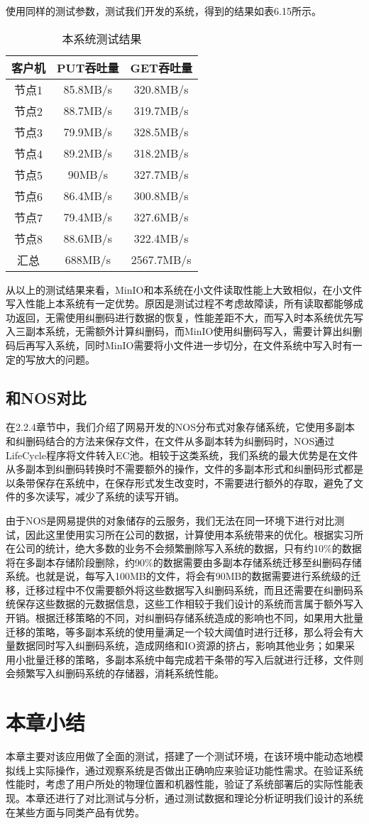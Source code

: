 使用同样的测试参数，测试我们开发的系统，得到的结果如表6.15所示。

\begin{table}[h]
    \centering
    \caption{本系统测试结果}
    \begin{tabular}{ccc}
      \toprule
      客户机   & PUT吞吐量  & GET吞吐量 \\
      \midrule
      节点1  & 85.8MB/s  & 320.8MB/s \\
      节点2  & 88.7MB/s  & 319.7MB/s \\
      节点3  & 79.9MB/s  & 328.5MB/s \\
      节点4  & 89.2MB/s  & 318.2MB/s \\
      节点5  & 90MB/s    & 327.7MB/s \\
      节点6  & 86.4MB/s  & 300.8MB/s \\
      节点7  & 79.4MB/s  & 327.6MB/s \\
      节点8  & 88.6MB/s  & 322.4MB/s \\
      汇总   & 688MB/s   & 2567.7MB/s \\
      \bottomrule
    \end{tabular}
\end{table}

从以上的测试结果来看，MinIO和本系统在小文件读取性能上大致相似，在小文件写入性能上本系统有一定优势。原因是测试过程不考虑故障读，所有读取都能够成功返回，无需使用纠删码进行数据的恢复，性能差距不大，而写入时本系统优先写入三副本系统，无需额外计算纠删码，而MinIO使用纠删码写入，需要计算出纠删码后再写入系统，同时MinIO需要将小文件进一步切分，在文件系统中写入时有一定的写放大的问题。

\subsection{和NOS对比}%
在2.2.4章节中，我们介绍了网易开发的NOS分布式对象存储系统，它使用多副本和纠删码结合的方法来保存文件，在文件从多副本转为纠删码时，NOS通过LifeCycle程序将文件转入EC池。相较于这类系统，我们系统的最大优势是在文件从多副本到纠删码转换时不需要额外的操作，文件的多副本形式和纠删码形式都是以条带保存在系统中，在保存形式发生改变时，不需要进行额外的存取，避免了文件的多次读写，减少了系统的读写开销。

由于NOS是网易提供的对象储存的云服务，我们无法在同一环境下进行对比测试，因此这里使用实习所在公司的数据，计算使用本系统带来的优化。根据实习所在公司的统计，绝大多数的业务不会频繁删除写入系统的数据，只有约10$\%$的数据将在多副本存储阶段删除，约90$\%$的数据需要由多副本存储系统迁移至纠删码存储系统。也就是说，每写入100MB的文件，将会有90MB的数据需要进行系统级的迁移，迁移过程中不仅需要额外将这些数据写入纠删码系统，而且还需要在纠删码系统保存这些数据的元数据信息，这些工作相较于我们设计的系统而言属于额外写入开销。根据迁移策略的不同，对纠删码存储系统造成的影响也不同，如果用大批量迁移的策略，等多副本系统的使用量满足一个较大阈值时进行迁移，那么将会有大量数据同时写入纠删码系统，造成网络和IO资源的挤占，影响其他业务；如果采用小批量迁移的策略，多副本系统中每完成若干条带的写入后就进行迁移，文件则会频繁写入纠删码系统的存储器，消耗系统性能。

\section{本章小结}%
本章主要对该应用做了全面的测试，搭建了一个测试环境，在该环境中能动态地模拟线上实际操作，通过观察系统是否做出正确响应来验证功能性需求。在验证系统性能时，考虑了用户所处的物理位置和机器性能，验证了系统部署后的实际性能表现。本章还进行了对比测试与分析，通过测试数据和理论分析证明我们设计的系统在某些方面与同类产品有优势。
